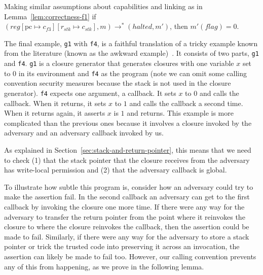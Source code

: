 \documentclass[format=acmsmall, review=true, screen=true]{acmart}
\renewcommand{\sectionname}{Section}
\newcommand{\update}[2]{[#1 \mapsto #2]}
\newcommand{\var}[1]{\mathit{#1}}
\newcommand{\pcreg}{\mathrm{pc}}
\newcommand{\reg}{\var{reg}}
\newcommand{\stk}{\var{stk}}
\newcommand{\flag}{\var{flag}}
\newcommand{\halted}{\mathit{halted}}
\newcommand{\step}[1][]{\rightarrow_{#1}}
\newcommand{\itoplassug}[1]{}
\begin{document}
\begin{lemma}
  \label{lem:correctness-f3}
  Making similar assumptions about capabilities and linking as in
  Lemma~\ref{lem:correctness-f1}
  if $(\reg\update{\pcreg}{c_{f3}}\update{r_\stk}{c_\stk},m) \step^*
  (\halted,m')$, then $m'(\flag) = 0$.
\end{lemma}

The final example, \texttt{g1} with \texttt{f4},
is a faithful translation of a tricky example known from the literature (known
as the awkward example)~\citep{pitts_operational_1998,Dreyer:jfp12}. It consists
of two parts, \texttt{g1} and \texttt{f4}.
\texttt{g1} is a closure generator that generates closures with
one variable $x$ set to $0$ in its environment and \texttt{f4} as
the program (note we can omit some calling convention security measures because
the stack is not used in the closure generator). \texttt{f4}
expects one argument, a callback. It sets $x$ to $0$ and calls the callback.
When it returns, it sets $x$ to $1$ and calls the callback a second time. When
it returns again, it asserts $x$ is $1$ and returns. This example is more
complicated than the previous ones because it involves a closure invoked by the
adversary and an adversary callback invoked by us.
\itoplassug{
  Suggestion: Maybe give some more intuition as to why it is difficult.
}
As explained in
\sectionname~\ref{sec:stack-and-return-pointer}, this means that we need to check (1)
that the stack pointer that the closure receives from the adversary has
write-local permission and (2) that the adversary callback is global.

To illustrate how subtle this program is, consider how an adversary could try to
make the assertion fail. In the second callback an adversary can get to the
first callback by invoking the closure one more time. If there were any way for
the adversary to transfer the return pointer from the point where it reinvokes
the closure to where the closure reinvokes the callback, then the assertion
could be made to fail. Similarly, if there were any way for the adversary to
store a stack pointer or trick the trusted code into preserving it across an
invocation, the assertion can likely be made to fail too. However, our calling
convention prevents any of this from happening, as we prove in the following
lemma.
\end{document}
